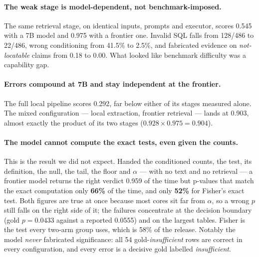 \paragraph{The weak stage is model-dependent, not benchmark-imposed.} The same
retrieval stage, on identical inputs, prompts and executor, scores 0.545 with a
7B model and 0.975 with a frontier one. Invalid SQL falls from 128/486 to
22/486, wrong conditioning from 41.5\% to 2.5\%, and fabricated evidence on
\emph{not-locatable} claims from 0.18 to 0.00. What looked like benchmark
difficulty was a capability gap.

\paragraph{Errors compound at 7B and stay independent at the frontier.} The full
local pipeline scores 0.292, far below either of its stages measured alone. The
mixed configuration --- local extraction, frontier retrieval --- lands at 0.903,
almost exactly the product of its two stages ($0.928 \times 0.975 = 0.904$).

\paragraph{The model cannot compute the exact tests, even given the counts.}
This is the result we did not expect. Handed the conditioned counts, the test,
its definition, the null, the tail, the floor and $\alpha$ --- with no text and
no retrieval --- a frontier model returns the right verdict 0.959 of the time
but p-values that match the exact computation only \textbf{66\%} of the time,
and only \textbf{52\%} for Fisher's exact test. Both figures are true at once
because most cores sit far from $\alpha$, so a wrong $p$ still falls on the
right side of it; the failures concentrate at the decision boundary (gold
$p=0.0433$ against a reported 0.0555) and on the largest tables. Fisher is the
test every two-arm group uses, which is 58\% of the release. Notably the model
\emph{never} fabricated significance: all 54 gold-\emph{insufficient} rows are
correct in every configuration, and every error is a decisive gold labelled
\emph{insufficient}.

